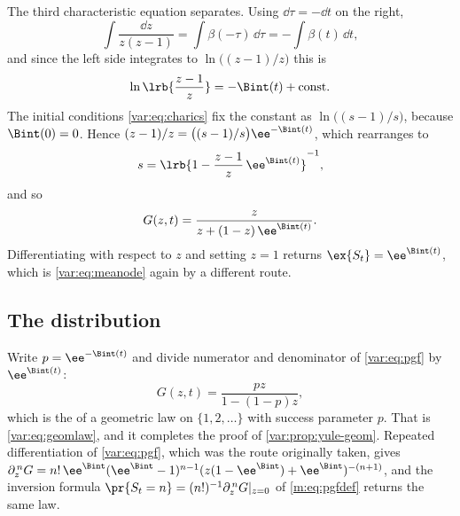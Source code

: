 The third characteristic equation separates. Using $\dd\tau=-\dd t$ on the
right,
\begin{equation}
\int\frac{\dd z}{z(z-1)}=\int\beta(-\tau)\,\dd\tau=-\int\beta(t)\,\dd t,
\label{var:eq:charsep}
\end{equation}
and since the left side integrates to $\ln\bigl((z-1)/z\bigr)$ this is
\[
\ln\lrb{\frac{z-1}{z}}=-\Bint(t)+\text{const}.
\]
The initial conditions \cref{var:eq:charics} fix the constant as
$\ln\bigl((s-1)/s\bigr)$, because $\Bint(0)=0$. Hence
$(z-1)/z=\bigl((s-1)/s\bigr)\ee^{-\Bint(t)}$, which rearranges to
\[
s=\lrb{1-\frac{z-1}{z}\,\ee^{\Bint(t)}}^{-1},
\]
and so
\begin{equation}
G(z,t)=\frac{z}{z+(1-z)\,\ee^{\Bint(t)}}.
\label{var:eq:pgf}
\end{equation}
Differentiating with respect to $z$ and setting $z=1$ returns
$\ex{S_t}=\ee^{\Bint(t)}$, which is \cref{var:eq:meanode} again by a
different route.

\subsection{The distribution}
\label{var:sec:distribution}

Write $p=\ee^{-\Bint(t)}$ and divide numerator and denominator of
\cref{var:eq:pgf} by $\ee^{\Bint(t)}$:
\begin{equation}
G(z,t)=\frac{pz}{1-(1-p)z},
\label{var:eq:geompgf}
\end{equation}
which is the \pgf{} of a geometric law on $\{1,2,\dots\}$ with success
parameter $p$. That is \cref{var:eq:geomlaw}, and it completes the proof of
\cref{var:prop:yule-geom}. Repeated differentiation of \cref{var:eq:pgf},
which was the route originally taken, gives $\partial_z^{\,n}G
=n!\,\ee^{\Bint}(\ee^{\Bint}-1)^{n-1}
(z(1-\ee^{\Bint})+\ee^{\Bint})^{-(n+1)}$, and the inversion formula
$\pr{S_t=n}=(n!)^{-1}\partial_z^{\,n}G|_{z=0}$ of \cref{m:eq:pgfdef} returns
the same law.

\FloatBarrier
